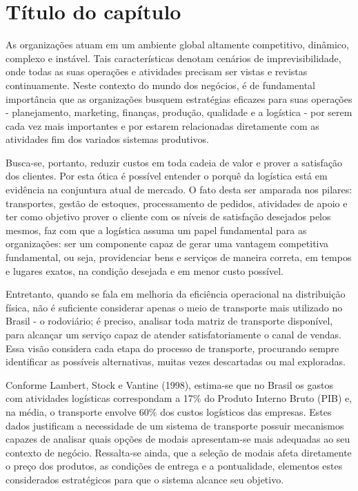 \chapter{Título do capítulo}\label{chapter:outro}

As organizações atuam em um ambiente global altamente competitivo, dinâmico, complexo e instável. Tais características denotam cenários de imprevisibilidade, onde todas as suas operações e atividades precisam ser vistas e revistas continuamente. Neste contexto do mundo dos negócios, é de fundamental importância que as organizações busquem estratégias eficazes para suas operações - planejamento, marketing, finanças, produção, qualidade e a logística - por serem cada vez mais importantes e por estarem relacionadas diretamente com as atividades fim dos variados sistemas produtivos.

Busca-se, portanto, reduzir custos em toda cadeia de valor e prover a satisfação dos clientes. Por esta ótica é possível entender o porquê da logística está em evidência na conjuntura atual de mercado. O fato desta ser amparada nos pilares: transportes, gestão de estoques, processamento de pedidos, atividades de apoio e ter como objetivo prover o cliente com os níveis de satisfação desejados pelos mesmos, faz com que a logística assuma um papel fundamental para as organizações: ser um componente capaz de gerar uma vantagem competitiva fundamental, ou seja, providenciar bens e serviços de maneira correta, em tempos e lugares exatos, na condição desejada e em menor custo possível.

Entretanto, quando se fala em melhoria da eficiência operacional na distribuição física, não é suficiente considerar apenas o meio de transporte mais utilizado no Brasil - o rodoviário; é preciso, analisar toda matriz de transporte disponível, para alcançar um serviço capaz de atender satisfatoriamente o canal de vendas. Essa visão considera cada etapa do processo de transporte, procurando sempre identificar as possíveis alternativas, muitas vezes descartadas ou mal exploradas.

Conforme Lambert, Stock e Vantine (1998), estima-se que no Brasil os gastos com atividades logísticas correspondam a 17\% do Produto Interno Bruto (PIB) e, na média, o transporte envolve 60\% dos custos logísticos das empresas. Estes dados justificam a necessidade de um sistema de transporte possuir mecanismos capazes de analisar quais opções de modais apresentam-se mais adequadas ao seu contexto de negócio. Ressalta-se ainda, que a seleção de modais afeta diretamente o preço dos produtos, as condições de entrega e a pontualidade, elementos estes considerados estratégicos para que o sistema alcance seu objetivo.

